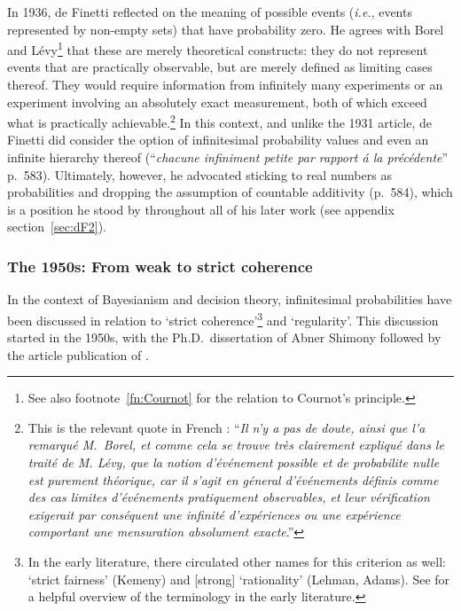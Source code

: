 In 1936, de Finetti reflected on the meaning of possible events (\textit{i.e.}, events represented by non-empty sets) that have probability zero. He agrees with Borel and L{\'e}vy\footnote{See also footnote~\ref{fn:Cournot} for the relation to Cournot's principle.} that these are merely theoretical constructs: they do not represent events that are practically observable, but are merely defined as limiting cases thereof. They would require information from infinitely many experiments or an experiment involving an absolutely exact measurement, both of which exceed what is practically achievable.\footnote{This is the relevant quote in French \citet[p.~577]{deFinetti:1936}: ``\textit{Il n'y a pas de doute, ainsi que l'a remarqu\'{e} M.\ Borel, et comme cela se trouve tr\`{e}s clairement expliqu\'{e} dans le trait\'{e} de M. L\'{e}vy, que la notion d'\'{e}v\'{e}nement possible et de probabilite nulle est purement th\'{e}orique, car il s'agit en g\'{e}neral d'\'{e}v\'{e}nements d\'{e}finis comme des cas limites d'\'{e}v\'{e}nements pratiquement observables, et leur v\'{e}rification exigerait par cons\'{e}quent une \emph{infinit\'{e}} d'exp\'{e}riences ou une exp\'{e}rience comportant une mensuration absolument \emph{exacte}}.''}
In this context, and unlike the 1931 article, de Finetti did consider the option of infinitesimal probability values and even an infinite hierarchy thereof (``\textit{chacune infiniment petite par rapport \'{a} la pr\'{e}c\'{e}dente}'' p.~583). Ultimately, however, he advocated sticking to real numbers as probabilities and dropping the assumption of countable additivity (p.~584), which is a position he stood by throughout all of his later work (see appendix section~\ref{sec:dF2}).

\subsubsection{The 1950s: From weak to strict coherence}\label{sec:coherence}
In the context of Bayesianism and decision theory, infinitesimal probabilities have been discussed in relation to `strict coherence'\footnote{In the early literature, there circulated other names for this criterion as well: `strict fairness' (Kemeny) and [strong] `rationality' (Lehman, Adams). See \citet[p.~114]{Carnap:1971b} for a helpful overview of the terminology in the early literature.} and `regularity'. This discussion started in the 1950s, with the Ph.D.\ dissertation of Abner Shimony followed by the article publication of \citet{Shimony:1955}.

